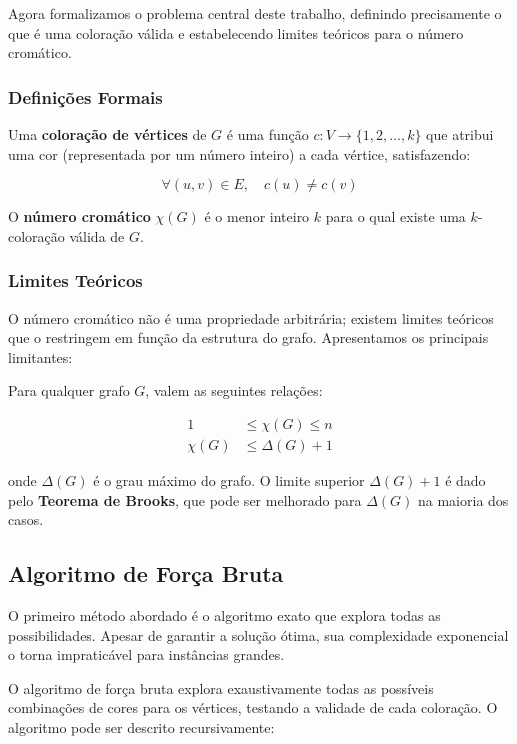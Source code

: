 \documentclass[12pt]{article}
\begin{document}
Agora formalizamos o problema central deste trabalho, definindo precisamente o que é uma coloração válida e estabelecendo limites teóricos para o número cromático.

\subsubsection{Definições Formais}

Uma \textbf{coloração de vértices} de $G$ é uma função $c: V \to \{1, 2, \ldots, k\}$ que atribui uma cor (representada por um número inteiro) a cada vértice, satisfazendo:

\begin{equation}
    \forall (u,v) \in E, \quad c(u) \neq c(v)
\end{equation}

O \textbf{número cromático} $\chi(G)$ é o menor inteiro $k$ para o qual existe uma $k$-coloração válida de $G$. 

\subsubsection{Limites Teóricos}

O número cromático não é uma propriedade arbitrária; existem limites teóricos que o restringem em função da estrutura do grafo. Apresentamos os principais limitantes:

Para qualquer grafo $G$, valem as seguintes relações:

\begin{align}
    1 &\leq \chi(G) \leq n \\
    \chi(G) &\leq \Delta(G) + 1
\end{align}

onde $\Delta(G)$ é o grau máximo do grafo. O limite superior $\Delta(G) + 1$ é dado pelo \textbf{Teorema de Brooks}, que pode ser melhorado para $\Delta(G)$ na maioria dos casos.

\subsection{Algoritmo de Força Bruta}

O primeiro método abordado é o algoritmo exato que explora todas as possibilidades. Apesar de garantir a solução ótima, sua complexidade exponencial o torna impraticável para instâncias grandes.

O algoritmo de força bruta explora exaustivamente todas as possíveis combinações de cores para os vértices, testando a validade de cada coloração. O algoritmo pode ser descrito recursivamente:
\end{document}
